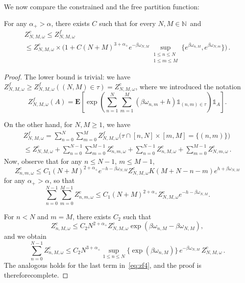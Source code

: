 \documentclass[AHL,Unicode,longabstracts]{cedram}
\newcommand{\ga}{\alpha}
\newcommand{\unbf}%
{\mathds{1}}
\newcommand{\bE}{\ensuremath{\mathbf{E}}}
\newcommand{\bbN}{\ensuremath{\mathbb{N}}}
\newcommand{\suptwo}[2]{\sup_{\substack{#1 \\ #2}}}
\begin{document}
We now compare the constrained and the free partition function:
\begin{lemm}\label{th:zfc}
For any $\ga_+ > \ga$, there exists $C$ such that for every $N,M \in \bbN$~and
\begin{multline}
Z^{c}_{N,M,\omega} \le Z^{f}_{N,M,\omega}\\
\le Z^{c}_{N,M,\omega}
\times \!\biggl(1 + C (N+M)^{3+\ga_+} e^{-\beta \omega_{N,M}} \suptwo{1 \le n \le N}{1 \le m \le M } \lbrace e^{\beta \omega_{n,M} }, e^{ \beta \omega_{N,m} } \rbrace \bigg)\,.
\end{multline}
\end{lemm}

\begin{proof}
The lower bound is trivial: we have $Z_{N,M,\omega}^{f} \geq Z^{f}_{N,M,\omega} ((N,M)\in\tau)=Z_{N,M,\omega}^{c}$, where we introduced the notation 
\[Z^{f}_{N,M,\omega} (A) =
\bE \left[\exp \!\left(\sum_{n=1}^N \sum_{m=1}^M (\beta \omega_{n,m} +h) \unbf_{(n,m) \in \tau} \right) \unbf_A \right].
\]

On the other hand, for $N,M \ge 1$, we have
\begin{multline}
Z^{f}_{N,M,\omega} = \sum_{n=0}^N \sum_{m=0}^{M} Z^{f}_{N,M,\omega} \big(\tau \cap [n,N] \times [m,M] = \lbrace (n,m) \rbrace \big) \\
\leq Z_{N,M,\omega}^c +\sum_{n=0}^{N-1} \sum_{m=0}^{M-1} Z_{n,m,\omega}^{c} + \sum_{n=0}^{N-1} Z_{n,M,\omega}^{c} +\sum_{m=0}^{M-1} Z_{N,m,\omega}^{c}\,.\label{eq:zf4}
\end{multline}
Now, observe that for any $n\leq N-1$, $m\leq M-1$,
\begin{equation}
Z^{c}_{n,m,\omega}
\le C_1 (N+M)^{2+ \ga_+} e^{ -h - \beta \omega_{N,M} } Z^{c}_{N,M,\omega} K (M+N -n-m) e^{ h+\beta \omega_{N,M} }
\end{equation}
for any $\ga_+ > \ga$, so that
\begin{equation}
\sum_{n=0}^{N-1} \sum_{m=0}^{M-1} Z^{c}_{n,m,\omega} \leq C_1 (N+M)^{2+ \ga_+} Z^{c}_{N,M,\omega}e^{-h - \beta \omega_{N,M} }.
\end{equation}

For $n < N$ and $m=M$, there exists $C_2$ such that
\begin{equation}
Z^{c}_{n,M,\omega} \le C_2 N^{2+\ga_+} Z^{c}_{N,M,\omega} \exp \left(\beta \omega_{n,M} - \beta \omega_{N,M} \right),
\end{equation}
and we obtain
\begin{equation}
\sum_{n=0}^{N-1} Z^{c}_{n,M,\omega} \le C_2 N ^{3 +\ga_+ } \sup_{1 \le n \le N} \lbrace \exp(\beta \omega_{n,M}) \rbrace\,e^{-\beta \omega_{N,M}}\,Z^{c}_{N,M,\omega}\,.
\end{equation}
The analogous holds for the last term in~\eqref{eq:zf4}, and the proof is therefore\linebreak complete.
\end{proof}
\end{document}

